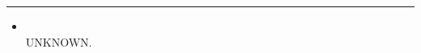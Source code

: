 \begin{multicols}{2}
\vspace{-10pt}\rule{\hsize}{0.4pt}\vspace{5pt}


\begin{itemize}
\item {}\\
UNKNOWN.
\end{itemize}

\end{multicols}



